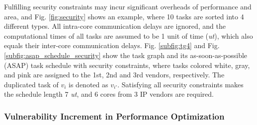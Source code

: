 \documentclass[10pt,journal, compsoc]{IEEEtran}
\begin{document}
Fulfilling security constraints may incur significant overheads of performance and area, and Fig. \ref{fig:security} shows an example, where 10 tasks are sorted into 4 different types. All intra-core communication delays are ignored, and the computational times of all tasks are assumed to be 1 unit of time (\textit{ut}), which also equals their inter-core communication delays. Fig. \ref{subfig:tg4} and Fig. \ref{subfig:asap_schedule_security} show the task graph and its as-soon-as-possible (ASAP) task schedule with security constraints, where tasks colored white, gray, and pink are assigned to the 1st, 2nd and 3rd vendors, respectively. The duplicated task of $v_i$ is denoted as $v_{i'}$. Satisfying all security constraints makes the schedule length 7 \textit{ut}, and 6 cores from 3 IP vendors are required.



\subsubsection{Vulnerability Increment in Performance Optimization}
\end{document}
